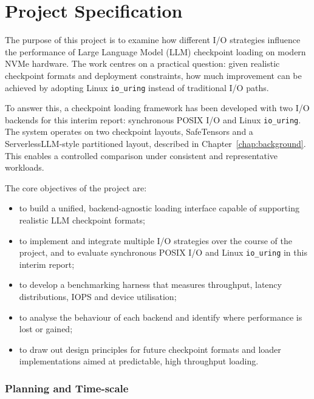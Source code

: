 \documentclass[]{final_report}
\begin{document}
\newpage

\chapter*{Project Specification}

The purpose of this project is to examine how different I/O strategies influence the performance of Large Language Model (LLM) checkpoint loading on modern NVMe hardware. The work centres on a practical question: given realistic checkpoint formats and deployment constraints, how much improvement can be achieved by adopting Linux \texttt{io\_uring} instead of traditional I/O paths.

To answer this, a checkpoint loading framework has been developed with two I/O backends for this interim report: synchronous POSIX I/O and Linux \texttt{io\_uring}. The system operates on two checkpoint layouts, SafeTensors and a ServerlessLLM-style partitioned layout, described in Chapter~\ref{chap:background}. This enables a controlled comparison under consistent and representative workloads.


The core objectives of the project are:

\begin{itemize}
\item to build a unified, backend-agnostic loading interface capable of supporting realistic LLM checkpoint formats;
\item to implement and integrate multiple I/O strategies over the course of the project, and to evaluate synchronous POSIX I/O and Linux \texttt{io\_uring} in this interim report;
\item to develop a benchmarking harness that measures throughput, latency distributions, IOPS and device utilisation;
\item to analyse the behaviour of each backend and identify where performance is lost or gained;
\item to draw out design principles for future checkpoint formats and loader implementations aimed at predictable, high throughput loading.
\end{itemize}


\subsection*{Planning and Time-scale}
\end{document}
